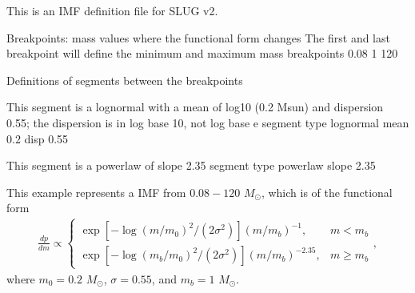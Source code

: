 \documentclass[letterpaper,10pt,english]{sphinxmanual}
\begin{document}
\begin{sphinxVerbatim}[commandchars=\\\{\}]
\PYGZsh{}\PYGZsh{}\PYGZsh{}\PYGZsh{}\PYGZsh{}\PYGZsh{}\PYGZsh{}\PYGZsh{}\PYGZsh{}\PYGZsh{}\PYGZsh{}\PYGZsh{}\PYGZsh{}\PYGZsh{}\PYGZsh{}\PYGZsh{}\PYGZsh{}\PYGZsh{}\PYGZsh{}\PYGZsh{}\PYGZsh{}\PYGZsh{}\PYGZsh{}\PYGZsh{}\PYGZsh{}\PYGZsh{}\PYGZsh{}\PYGZsh{}\PYGZsh{}\PYGZsh{}\PYGZsh{}\PYGZsh{}\PYGZsh{}\PYGZsh{}\PYGZsh{}\PYGZsh{}\PYGZsh{}\PYGZsh{}\PYGZsh{}\PYGZsh{}\PYGZsh{}\PYGZsh{}\PYGZsh{}\PYGZsh{}\PYGZsh{}\PYGZsh{}\PYGZsh{}\PYGZsh{}\PYGZsh{}\PYGZsh{}\PYGZsh{}\PYGZsh{}\PYGZsh{}\PYGZsh{}\PYGZsh{}\PYGZsh{}\PYGZsh{}\PYGZsh{}\PYGZsh{}\PYGZsh{}\PYGZsh{}\PYGZsh{}\PYGZsh{}
\PYGZsh{} This is an IMF definition file for SLUG v2.

\PYGZsh{} Breakpoints: mass values where the functional form changes
\PYGZsh{} The first and last breakpoint will define the minimum and
\PYGZsh{} maximum mass
breakpoints 0.08 1 120

\PYGZsh{} Definitions of segments between the breakpoints

\PYGZsh{} This segment is a lognormal with a mean of log\PYGZus{}10 (0.2 Msun)
\PYGZsh{} and dispersion 0.55; the dispersion is in log base 10, not
\PYGZsh{} log base e
segment
type lognormal
mean 0.2
disp 0.55

\PYGZsh{} This segment is a powerlaw of slope \PYGZhy{}2.35
segment
type powerlaw
slope \PYGZhy{}2.35
\end{sphinxVerbatim}

This example represents a  IMF from \(0.08 - 120\) \(M_\odot\), which is of the functional form
\begin{equation*}
\begin{split}\frac{dp}{dm} \propto \left\{\begin{array}{ll} \exp[-\log(m/m_0)^2/(2\sigma^2)] (m/m_b)^{-1} , & m < m_b \\ \exp[-\log(m_b/m_0)^2/(2\sigma^2)] (m/m_b)^{-2.35}, & m \geq m_b \end{array} \right.,\end{split}
\end{equation*}
where \(m_0 = 0.2\) \(M_\odot\), \(\sigma = 0.55\), and \(m_b = 1\) \(M_\odot\).
\end{document}
